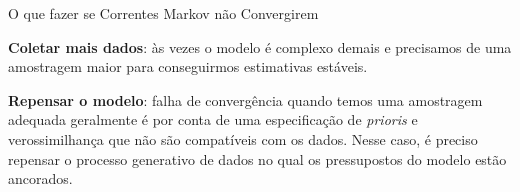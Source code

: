 \begin{frame}{O que fazer se Correntes Markov não Convergirem}
  \begin{vfilleditems}
    \item \textbf{Coletar mais dados}: às vezes o modelo é complexo demais e
    precisamos de uma amostragem maior para conseguirmos estimativas estáveis.
    \item \textbf{Repensar o modelo}: falha de convergência quando temos uma
    amostragem adequada geralmente é por conta de uma especificação de \textit{prioris} e
    verossimilhança que não são compatíveis com os dados. Nesse caso, é preciso
    repensar o processo generativo de dados no qual os pressupostos do modelo
    estão ancorados.
  \end{vfilleditems}
\end{frame}
